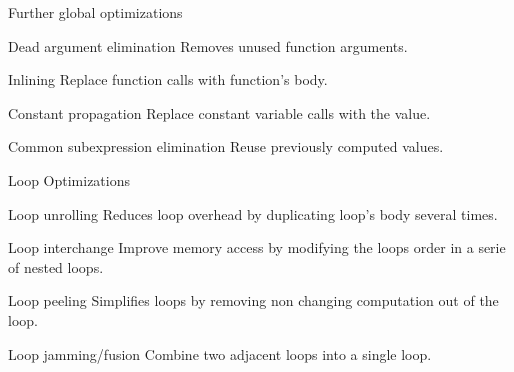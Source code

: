 \documentclass{beamer}
\begin{document}
    \begin{frame}[<+->]{Further global optimizations}
        \begin{block}{Dead argument elimination}
            Removes unused function arguments.
        \end{block}
        \begin{block}{Inlining}
            Replace function calls with function's body.
        \end{block}
        \begin{block}{Constant propagation}
            Replace constant variable calls with the value.
        \end{block}
        \begin{block}{Common subexpression elimination}
            Reuse previously computed values.
        \end{block}
    \end{frame}

    \begin{frame}[<+->]{Loop Optimizations}
        \begin{block}{Loop unrolling}
            Reduces loop overhead by duplicating loop's body several times.
        \end{block}
        \begin{block}{Loop interchange}
            Improve memory access by modifying the loops order in a serie of nested loops.
        \end{block}
        \begin{block}{Loop peeling}
            Simplifies loops by removing non changing computation out of the loop.
        \end{block}
        \begin{block}{Loop jamming/fusion}
            Combine two adjacent loops into a single loop.
        \end{block}
    \end{frame}
    
\end{document}
